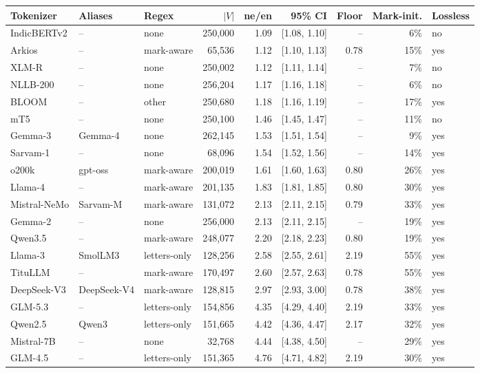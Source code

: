 \begin{table}[t]
\centering\small
\setlength{\tabcolsep}{4pt}
\begin{tabular}{lllrrrrrl}
\toprule
Tokenizer & Aliases & Regex & $|V|$ & ne/en & 95\% CI & Floor & Mark-init. & Lossless \\
\midrule
IndicBERTv2 & -- & none & 250,000 & 1.09 & [1.08, 1.10] & -- & 6\% & no \\
Arkios & -- & mark-aware & 65,536 & 1.12 & [1.10, 1.13] & 0.78 & 15\% & yes \\
XLM-R & -- & none & 250,002 & 1.12 & [1.11, 1.14] & -- & 7\% & no \\
NLLB-200 & -- & none & 256,204 & 1.17 & [1.16, 1.18] & -- & 6\% & no \\
BLOOM & -- & other & 250,680 & 1.18 & [1.16, 1.19] & -- & 17\% & yes \\
mT5 & -- & none & 250,100 & 1.46 & [1.45, 1.47] & -- & 11\% & no \\
Gemma-3 & Gemma-4 & none & 262,145 & 1.53 & [1.51, 1.54] & -- & 9\% & yes \\
Sarvam-1 & -- & none & 68,096 & 1.54 & [1.52, 1.56] & -- & 14\% & yes \\
o200k & gpt-oss & mark-aware & 200,019 & 1.61 & [1.60, 1.63] & 0.80 & 26\% & yes \\
Llama-4 & -- & mark-aware & 201,135 & 1.83 & [1.81, 1.85] & 0.80 & 30\% & yes \\
Mistral-NeMo & Sarvam-M & mark-aware & 131,072 & 2.13 & [2.11, 2.15] & 0.79 & 33\% & yes \\
Gemma-2 & -- & none & 256,000 & 2.13 & [2.11, 2.15] & -- & 19\% & yes \\
Qwen3.5 & -- & mark-aware & 248,077 & 2.20 & [2.18, 2.23] & 0.80 & 19\% & yes \\
Llama-3 & SmolLM3 & letters-only & 128,256 & 2.58 & [2.55, 2.61] & 2.19 & 55\% & yes \\
TituLLM & -- & mark-aware & 170,497 & 2.60 & [2.57, 2.63] & 0.78 & 55\% & yes \\
DeepSeek-V3 & DeepSeek-V4 & mark-aware & 128,815 & 2.97 & [2.93, 3.00] & 0.78 & 38\% & yes \\
GLM-5.3 & -- & letters-only & 154,856 & 4.35 & [4.29, 4.40] & 2.19 & 33\% & yes \\
Qwen2.5 & Qwen3 & letters-only & 151,665 & 4.42 & [4.36, 4.47] & 2.17 & 32\% & yes \\
Mistral-7B & -- & none & 32,768 & 4.44 & [4.38, 4.50] & -- & 29\% & yes \\
GLM-4.5 & -- & letters-only & 151,365 & 4.76 & [4.71, 4.82] & 2.19 & 30\% & yes \\

\end{tabular}
\end{table}
